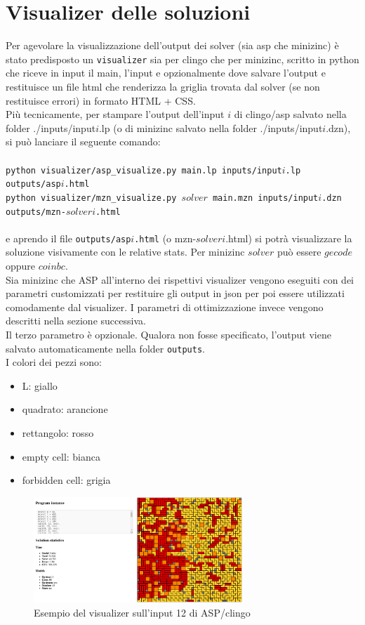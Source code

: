 \documentclass{article}
\begin{document}
\section{Visualizer delle soluzioni}
Per agevolare la visualizzazione dell'output dei solver (sia asp che minizinc) è stato predisposto un \texttt{visualizer} sia per clingo che per minizinc, scritto in python che riceve in input il main, l'input e opzionalmente dove salvare l'output e restituisce un file html che renderizza la griglia trovata dal solver (se non restituisce errori) in formato HTML + CSS.\\
Più tecnicamente, per stampare l'output dell'input $i$ di clingo/asp salvato nella folder ./inputs/input$i$.lp (o di minizinc salvato nella folder ./inputs/input$i$.dzn), si può lanciare il seguente comando:\\\\
\hspace*{.5cm}\texttt{python visualizer/asp\_visualize.py main.lp inputs/input$i$.lp outputs/asp$i$.html}\\
\hspace*{.5cm}\texttt{python visualizer/mzn\_visualize.py $solver$ main.mzn inputs/input$i$.dzn outputs/mzn-$solver$$i$.html}\\\\
e aprendo il file \texttt{outputs/asp$i$.html} (o mzn-$solver$$i$.html) si potrà visualizzare la soluzione visivamente con le relative stats. Per minizinc $solver$ può essere $gecode$ oppure $coinbc$.\\
Sia minizinc che ASP all'interno dei rispettivi visualizer vengono eseguiti con dei parametri customizzati per restituire gli output in json per poi essere utilizzati comodamente dal visualizer. I parametri di ottimizzazione invece vengono descritti nella sezione successiva.\\
Il terzo parametro è opzionale. Qualora non fosse specificato, l'output viene salvato automaticamente nella folder \texttt{outputs}.\\
I colori dei pezzi sono:
\begin{itemize}
    \item L: giallo
    \item quadrato: arancione
    \item rettangolo: rosso
    \item empty cell: bianca
    \item forbidden cell: grigia
\end{itemize}
\begin{figure}[ht!]
    \centering
    \includegraphics[width=0.7\textwidth]{images/visualizer.png}
    \caption{Esempio del visualizer sull'input 12 di ASP/clingo}
\end{figure}
\end{document}

